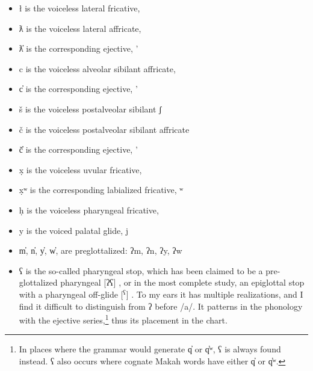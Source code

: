 \begin{itemize}
	\item ł is the voiceless lateral fricative, \textbeltl
	\item ƛ is the voiceless lateral affricate, 
	\item ƛ̓ is the corresponding ejective, '
	\item c is the voiceless alveolar sibilant affricate, 
	\item c̓ is the corresponding ejective, '
	\item š is the voiceless postalveolar sibilant ʃ
	\item č is the voiceless postalveolar sibilant affricate 
	\item č̓ is the corresponding ejective, '
	\item x̣ is the voiceless uvular fricative, \textchi
	\item x̣ʷ is the corresponding labialized fricative, {\textchi}ʷ
	\item ḥ is the voiceless pharyngeal fricative, {\textcrh}
	\item y is the voiced palatal glide, j
	\item m̓, n̓, y̓, w̓, are preglottalized: ʔm, ʔn, ʔy, ʔw
	\item ʕ is the so-called pharyngeal stop, which has been claimed to be a pre-glottalized pharyngeal [ʔʕ] \citep{shank2000}, or in the most complete study, an epiglottal stop with a pharyngeal off-glide [\textbarglotstop$^{\text{ʕ}}$] \citep{carlson2001, esling2005}. To my ears it has multiple realizations, and I find it difficult to distinguish from ʔ before /a/. It patterns in the phonology with the ejective series,\footnote{In places where the grammar would generate q̓ or q̓ʷ, ʕ is always found instead. ʕ also occurs where cognate Makah words have either q̓ or q̓ʷ.} thus its placement in the chart.
\end{itemize}